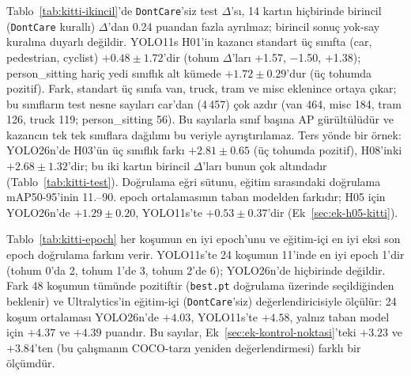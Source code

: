 

Tablo~\ref{tab:kitti-ikincil}'de \texttt{DontCare}'siz test $\Delta$'sı, 14 kartın hiçbirinde birincil (\texttt{DontCare} kurallı) $\Delta$'dan 0.24 puandan fazla ayrılmaz; birincil sonuç yok-say kuralına duyarlı değildir. YOLO11s H01'in kazancı standart üç sınıfta (car, pedestrian, cyclist) $+0.48\pm1.72$'dir (tohum $\Delta$'ları +1.57, $-$1.50, +1.38); person\_sitting hariç yedi sınıflık alt kümede $+1.72\pm0.29$'dur (üç tohumda pozitif). Fark, standart üç sınıfa van, truck, tram ve misc eklenince ortaya çıkar; bu sınıfların test nesne sayıları car'dan (4\,457) çok azdır (van 464, misc 184, tram 126, truck 119; person\_sitting 56). Bu sayılarla sınıf başına AP gürültülüdür ve kazancın tek tek sınıflara dağılımı bu veriyle ayrıştırılamaz. Ters yönde bir örnek: YOLO26n'de H03'ün üç sınıflık farkı $+2.81\pm0.65$ (üç tohumda pozitif), H08'inki $+2.68\pm1.32$'dir; bu iki kartın birincil $\Delta$'ları bunun çok altındadır (Tablo~\ref{tab:kitti-test}). Doğrulama eğri sütunu, eğitim sırasındaki doğrulama mAP50-95'inin 11.--90. epoch ortalamasının taban modelden farkıdır; H05 için YOLO26n'de $+1.29\pm0.20$, YOLO11s'te $+0.53\pm0.37$'dir (Ek~\ref{sec:ek-h05-kitti}).



Tablo~\ref{tab:kitti-epoch} her koşumun en iyi epoch'unu ve eğitim-içi en iyi eksi son epoch doğrulama farkını verir. YOLO11s'te 24 koşumun 11'inde en iyi epoch 1'dir (tohum 0'da 2, tohum 1'de 3, tohum 2'de 6); YOLO26n'de hiçbirinde değildir. Fark 48 koşumun tümünde pozitiftir (\texttt{best.pt} doğrulama üzerinde seçildiğinden beklenir) ve Ultralytics'in eğitim-içi (\texttt{DontCare}'siz) değerlendiricisiyle ölçülür: 24 koşum ortalaması YOLO26n'de $+4.03$, YOLO11s'te $+4.58$, yalnız taban model için $+4.37$ ve $+4.39$ puandır. Bu sayılar, Ek~\ref{sec:ek-kontrol-noktasi}'teki $+3.23$ ve $+3.84$'ten (bu çalışmanın COCO-tarzı yeniden değerlendirmesi) farklı bir ölçümdür.



